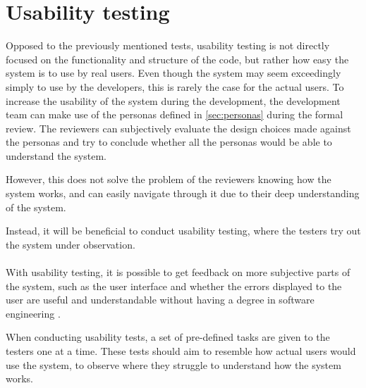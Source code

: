 \section{Usability testing}
Opposed to the previously mentioned tests, usability testing is not directly focused on the functionality and structure of the code, but rather how easy the system is to use by real users.
Even though the system may seem exceedingly simply to use by the developers, this is rarely the case for the actual users.
To increase the usability of the system during the development, the development team can make use of the personas defined in \autoref{sec:personas} during the formal review.
The reviewers can subjectively evaluate the design choices made against the personas and try to conclude whether all the personas would be able to understand the system.

However, this does not solve the problem of the reviewers knowing how the system works, and can easily navigate through it due to their deep understanding of the system.

Instead, it will be beneficial to conduct usability testing, where the testers try out the system under observation.
\\\\
With usability testing, it is possible to get feedback on more subjective parts of the system, such as the user interface and whether the errors displayed to the user are useful and understandable without having a degree in software engineering \cite{SoftwareTesting}.

When conducting usability tests, a set of pre-defined tasks are given to the testers one at a time.
These tests should aim to resemble how actual users would use the system, to observe where they struggle to understand how the system works.
